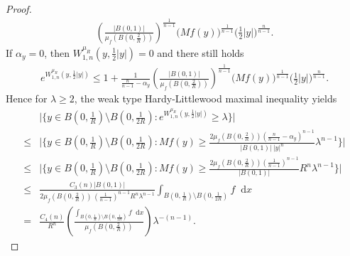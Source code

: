 \documentclass[10pt,a4paper]{amsart}
\numberwithin{equation}{section}
\newcommand{\dx}{\mathop{}\!\mathrm{d}x}
\begin{document}
\begin{proof}
\begin{align*}
        \left(\frac{|B(0,1)|}{\mu_f(B(0,\frac{2}{R}))}\right)^{\frac{1}{n-1}}
        \Big(Mf(y)\Big)^{\frac{1}{n-1}}
        \Big(\frac{1}{2}|y|\Big)^{\frac{n}{n-1}}.
    \end{align*}
    If $\alpha_y=0$, then $W_{1,n}^{\mu_R}(y,\frac{1}{2}|y|)=0$ and there still holds
    \begin{align*}
        e^{W_{1,n}^{\mu_R}(y,\frac{1}{2}|y|)}
        \leq 1
        +\frac{1}{\frac{n}{n-1}-\alpha_y}
        \left(\frac{|B(0,1)|}{\mu_f(B(0,\frac{2}{R}))}\right)^{\frac{1}{n-1}}
        \Big(Mf(y)\Big)^{\frac{1}{n-1}}
        \Big(\frac{1}{2}|y|\Big)^{\frac{n}{n-1}}.
    \end{align*}
    Hence for $\lambda\geq 2$, the weak type Hardy-Littlewood maximal inequality yields
    \begin{align*}
        &\Big|\Big\{
        y\in B(0,\frac{1}{R})\setminus B(0,\frac{1}{2R}):
        e^{W_{1,n}^{\mu_R}(y,\frac{1}{2}|y|)}\geq \lambda
        \Big\}\Big|\\
        \leq& 
        \bigg|\bigg\{
        y\in B(0,\frac{1}{R})\setminus B(0,\frac{1}{2R}):
        Mf(y)\geq \frac{2\mu_f(B(0,\frac{2}{R}))(\frac{n}{n-1}-\alpha_y)^{n-1}}{|B(0,1)|\ |y|^n}\lambda^{n-1}
        \bigg\}\bigg|\\
        \leq&
        \bigg|\bigg\{
        y\in B(0,\frac{1}{R})\setminus B(0,\frac{1}{2R}):
        Mf(y)\geq \frac{2\mu_f(B(0,\frac{2}{R}))(\frac{1}{n-1})^{n-1}}{|B(0,1)|}R^n\lambda^{n-1}
       \bigg\}\bigg|\\
        \leq&
        \frac{C_3(n)|B(0,1)|}{2\mu_f(B(0,\frac{2}{R}))\, (\frac{1}{n-1})^{n-1}R^n\lambda^{n-1}} 
        \int_{B(0,\frac{1}{R})\setminus B(0,\frac{1}{2R})} f\dx\\
        =& \frac{C_4(n)}{R^n}
        \left(\frac{\int_{B(0,\frac{1}{R})\setminus B(0,\frac{1}{2R})} f\dx}{\mu_f(B(0,\frac{2}{R}))}\right)
        \lambda^{-(n-1)}.
    \end{align*}


\end{proof}
\end{document}
